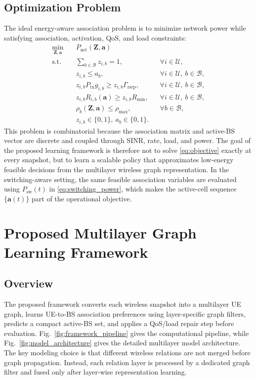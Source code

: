 \documentclass[journal]{IEEEtran}
\begin{document}
\subsection{Optimization Problem}
The ideal energy-aware association problem is to minimize network power while
satisfying association, activation, QoS, and load constraints:
\begin{align}
    \min_{\mathbf{Z},\mathbf{a}} \quad
    & P_{\mathrm{net}}(\mathbf{Z},\mathbf{a}) \label{eq:objective}\\
    \text{s.t.}\quad
    & \sum_{b\in\mathcal{B}} z_{i,b}=1,
    && \forall i\in\mathcal{U}, \nonumber\\
    & z_{i,b}\leq a_b,
    && \forall i\in\mathcal{U},\ b\in\mathcal{B}, \nonumber\\
    & z_{i,b}P_{\mathrm{tx}}g_{i,b}\geq z_{i,b}\Gamma_{\mathrm{rsrp}},
    && \forall i\in\mathcal{U},\ b\in\mathcal{B}, \nonumber\\
    & z_{i,b}R_{i,b}(\mathbf{a})\geq z_{i,b}R_{\min},
    && \forall i\in\mathcal{U},\ b\in\mathcal{B}, \nonumber\\
    & \rho_b(\mathbf{Z},\mathbf{a})\leq \rho_{\max},
    && \forall b\in\mathcal{B}, \nonumber\\
    & z_{i,b}\in\{0,1\},\ a_b\in\{0,1\}.
    && \nonumber
\end{align}
This problem is combinatorial because the association matrix and active-BS
vector are discrete and coupled through SINR, rate, load, and power. The goal
of the proposed learning framework is therefore not to solve
\eqref{eq:objective} exactly at every snapshot, but to learn a scalable policy
that approximates low-energy feasible decisions from the multilayer wireless
graph representation. In the switching-aware setting, the same feasible
association variables are evaluated using $P_{\mathrm{sw}}(t)$ in
\eqref{eq:switching_power}, which makes the active-cell sequence
$\{\mathbf{a}(t)\}$ part of the operational objective.

\section{Proposed Multilayer Graph Learning Framework}
\subsection{Overview}
The proposed framework converts each wireless snapshot into a multilayer UE
graph, learns UE-to-BS association preferences using layer-specific graph
filters, predicts a compact active-BS set, and applies a QoS/load repair step
before evaluation. Fig.~\ref{fig:framework_pipeline} gives the computational
pipeline, while Fig.~\ref{fig:model_architecture} gives the detailed
multilayer model architecture. The key modeling choice is that different
wireless relations are not merged before graph propagation. Instead, each
relation layer is processed by a dedicated graph filter and fused only after
layer-wise representation learning.
\end{document}
